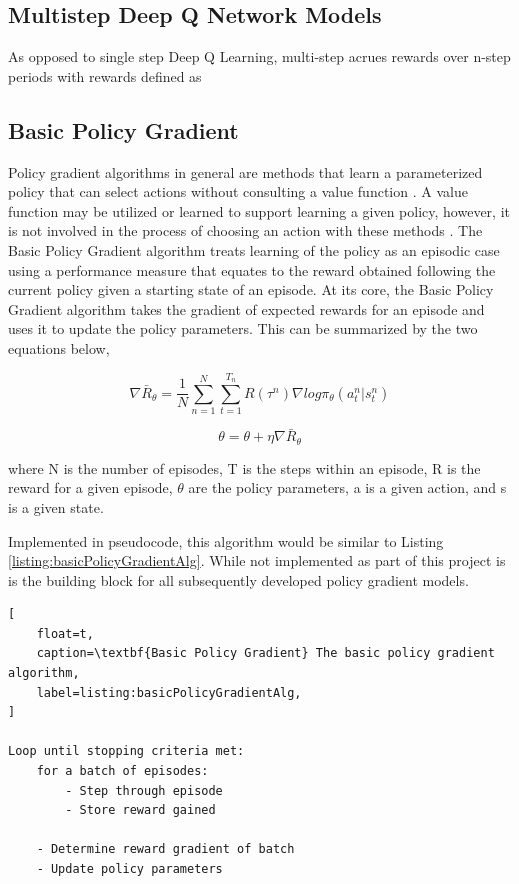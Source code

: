 \documentclass[conference]{IEEEtran}
\begin{document}
\subsection{Multistep Deep Q Network Models}
As opposed to single step Deep Q Learning, multi-step acrues rewards over n-step periods with rewards defined as 

\subsection{Basic Policy Gradient}
Policy gradient algorithms in general are methods that learn a parameterized policy that can select actions without consulting a value function \cite{ReinforcementLearningBook}.
A value function may be utilized or learned to support learning a given policy, however, it is not involved in the process of choosing an action with these methods \cite{ReinforcementLearningBook}.
The Basic Policy Gradient algorithm treats learning of the policy as an episodic case using a performance measure that equates to the reward obtained following the current policy given a starting state of an episode. 
At its core, the Basic Policy Gradient algorithm takes the gradient of expected rewards for an episode and uses it to update the policy parameters.
This can be summarized by the two equations below,

$$\nabla \bar{R}_{\theta} = \frac{1}{N} \sum \limits_{n=1}^N \sum \limits_{t=1}^{T_n} R(\tau^n) \nabla log\pi_{\theta}(a_{t}^n | s_{t}^n)$$

$$\theta = \theta  + \eta \nabla \bar{R}_{\theta}$$

where N is the number of episodes, T is the steps within an episode, R is the reward for a given episode, $\theta$ are the policy parameters, a is a given action, and s is a given state.

Implemented in pseudocode, this algorithm would be similar to Listing \ref{listing:basicPolicyGradientAlg}.
While not implemented as part of this project is is the building block for all subsequently developed policy gradient models.

\begin{lstlisting}[
    float=t,
    caption=\textbf{Basic Policy Gradient} The basic policy gradient algorithm,
    label=listing:basicPolicyGradientAlg,
]

Loop until stopping criteria met:
    for a batch of episodes:
        - Step through episode
        - Store reward gained

    - Determine reward gradient of batch
    - Update policy parameters
\end{lstlisting}
\end{document}
